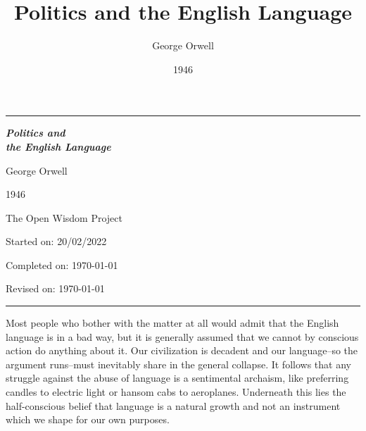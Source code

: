 \documentclass[a4paper]{article}
\title{Politics and the English Language}
\author{George Orwell}
\date{1946}
\makeatletter
\renewcommand{\maketitle}{\bgroup\setlength{\parindent}{0pt}
\begin{flushleft}
  \huge{\textbf{\@title}}
  
  \vspace{0.2cm}
  
  \large{\@author}
  
  \vspace{0.1cm}
  
  \normalsize{\@date}
\end{flushleft}\egroup
}
\makeatother
\begin{document}
\begin{titlepage}

 \hrule
 
  \vspace*{120pt}%
  
  \centering

  \HUGE \textbf{\textit{Politics and \\ the English Language}}

  \bigskip

  \LARGE George Orwell%

  \smallskip

  \large 1946%

  \vspace{300pt}%

  \normalsize
  The Open Wisdom Project
  \footnotesize
  
  Started on: 20/02/2022
  
  Completed on: \today
  
  Revised on: \today
  
  \vfill
  
  \hrule
\end{titlepage}


\vspace{0.4cm}

Most people who bother with the matter at all would admit that the English language is in a bad way, but it is generally assumed that we cannot by conscious action do anything about it. Our civilization is decadent and our language--so the argument runs--must inevitably share in the general collapse. It follows that any struggle against the abuse of language is a sentimental archaism, like preferring candles to electric light or hansom cabs to aeroplanes. Underneath this lies the half-conscious belief that language is a natural growth and not an instrument which we shape for our own purposes.
\end{document}
